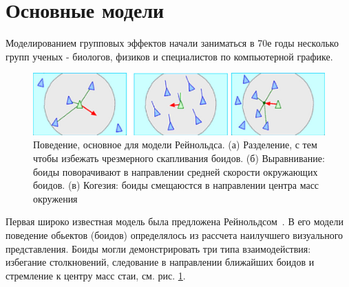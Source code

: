     \section{Основные модели} %
    \label{sec:CompModelsBasics}
    Моделированием групповых эффектов начали заниматься в 70е годы несколько групп ученых - биологов, физиков и специалистов по компьютерной графике. 
    \begin{figure}
        \centering
        \includegraphics[width=\textwidth]{Images/Fig31_CollectiveMotion}
        \caption{Поведение, основное для модели Рейнольдса. (а) Разделение, с тем чтобы избежать чрезмерного скапливания боидов. (б) Выравнивание: боиды поворачивают в направлении средней скорости окружающих боидов. (в) Когезия: боиды смещаюстся в направлении центра масс окружения}
        \label{fig:ReynoldsModel}
    \end{figure}
    Первая широко известная модель была предложена Рейнольдсом~\cite{reynolds1987}. В его модели поведение обьектов (боидов) определялось из рассчета наилучшего визуального представления. Боиды могли демонстрировать три типа взаимодействия: избегание столкновений, следование в направлении ближайших боидов и стремление к центру масс стаи, см. рис. \ref{fig:ReynoldsModel}. 

